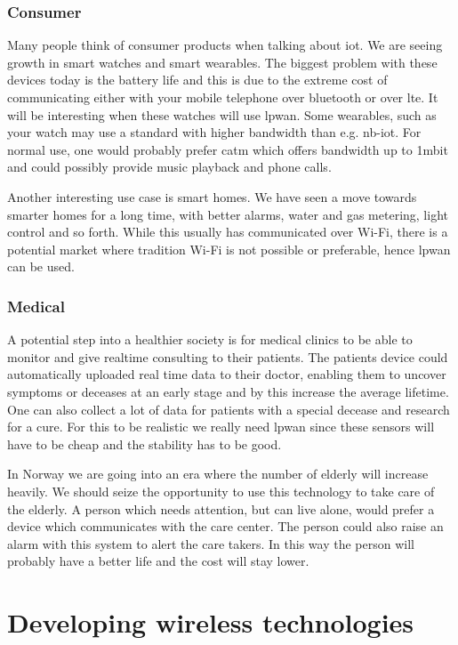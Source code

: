 \documentclass[USenglish]{ifimaster}  %
\begin{document}
\subsubsection{Consumer}
Many people think of consumer products when talking about \acrshort{iot}. We are seeing growth in smart watches and smart wearables. The biggest problem with these devices today is the battery life and this is due to the extreme cost of communicating either with your mobile telephone over bluetooth or over \acrshort{lte}. It will be interesting when these watches will use \acrshort{lpwan}. Some wearables, such as your watch may use a standard with higher bandwidth than e.g. \acrshort{nb-iot}. For normal use, one would probably prefer \acrshort{catm} which offers bandwidth up to 1\acrshort{mbit} and could possibly provide music playback and phone calls.

Another interesting use case is smart homes. We have seen a move towards smarter homes for a long time, with better alarms, water and gas metering, light control and so forth. While this usually has communicated over Wi-Fi, there is a potential market where tradition Wi-Fi is not possible or preferable, hence \acrshort{lpwan} can be used.

\subsubsection{Medical}
A potential step into a healthier society is for medical clinics to be able to monitor and give realtime consulting to their patients. The patients device could automatically uploaded real time data to their doctor, enabling them to uncover symptoms or deceases at an early stage and by this increase the average lifetime. One can also collect a lot of data for patients with a special decease and research for a cure. For this to be realistic we really need \acrshort{lpwan} since these sensors will have to be cheap and the stability has to be good.

In Norway we are going into an era where the number of elderly will increase heavily. We should seize the opportunity to use this technology to take care of the elderly. A person which needs attention, but can live alone, would prefer a device which communicates with the care center. The person could also raise an alarm with this system to alert the care takers. In this way the person will probably have a better life and the cost will stay lower.

\section{Developing wireless technologies} \label{section:wirelesstech}
\end{document}
